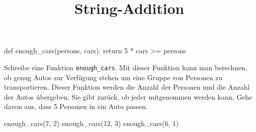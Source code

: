 \documentclass[a4paper, fontsize = 13, DIV = calc]{scrartcl}
\title{String-Addition}
\date{}
\newcommand{\expandpyconc}[1]{\expandafter\reallyexpandpyconc\expandafter{#1}}
\newcommand{\reallyexpandpyconc}[1]{\pyconc{exec(compile(open('#1', 'rb').read(), '#1', 'exec'))}}
\newenvironment{pyconcodeblck}[1]
{\newcommand{\snippetfile}{snippet-#1.py}
	\VerbatimEnvironment
	\begin{VerbatimOut}{\snippetfile}}
	{\end{VerbatimOut}
	\expandpyconc{\snippetfile}}
\begin{document}
\begin{pyconcodeblck}{temp}
def enough_cars(persons, cars):
	return 5 * cars >= persons
\end{pyconcodeblck}





\begin{aufgabe} \noindent 
Schreibe eine Funktion \texttt{enough_cars}. Mit dieser Funktion kann man berechnen, ob genug Autos zur Verfügung stehen um eine Gruppe von Personen zu transportieren. Dieser Funktion werden die Anzahl der Personen  und die Anzahl der Autos übergeben. Sie gibt zurück, ob jeder mitgenommen werden kann. Gehe davon aus, dass 5 Personen in ein Auto passen.
\begin{pyconsole}
enough_cars(7, 2)
enough_cars(12, 3)
enough_cars(6, 1)
\end{pyconsole}
\end{aufgabe}



\newpage
\end{document}

